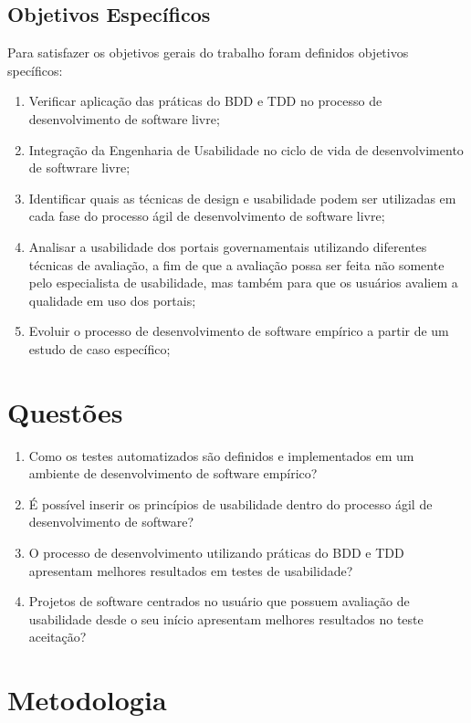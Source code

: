 \subsection{Objetivos Específicos}

Para satisfazer os objetivos gerais do trabalho foram definidos objetivos specíficos:

\begin{enumerate}
\item Verificar aplicação das práticas do BDD e TDD no processo de desenvolvimento de software livre;
\item Integração da Engenharia de Usabilidade no ciclo de vida de desenvolvimento de softwrare livre;
\item Identificar quais as técnicas de design e usabilidade  podem ser utilizadas em cada fase do processo ágil de desenvolvimento de software livre;
\item Analisar a usabilidade dos portais governamentais utilizando diferentes técnicas de avaliação, a fim de que a avaliação possa ser feita não somente pelo especialista de usabilidade, mas também para que os usuários avaliem a qualidade em uso dos portais;
\item Evoluir o processo de desenvolvimento de software empírico a partir de um estudo de caso específico;
\end{enumerate}

\section{Questões}
\begin{enumerate}
\item Como os testes automatizados são definidos e implementados em um ambiente de desenvolvimento de software empírico?
\item É possível inserir os princípios de usabilidade dentro do processo ágil de desenvolvimento de software?
\item O processo de desenvolvimento utilizando práticas do BDD e TDD apresentam melhores resultados em testes de usabilidade?
\item Projetos de software centrados no usuário que possuem avaliação de usabilidade desde o seu início apresentam melhores resultados no teste aceitação?
\end{enumerate}
	 
\section{Metodologia}

